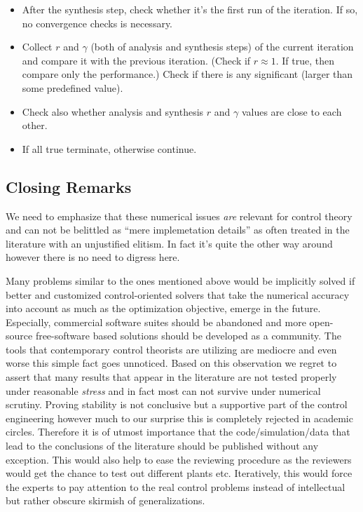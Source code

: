 \begin{itemize}
	\item After the synthesis step, check whether it's the first run of the iteration. If so, no convergence checks is
	necessary.
	\item Collect $r$ and $\gamma$ (both of analysis and synthesis steps) of the current iteration and compare it with 
	the previous iteration. (Check if $r\approx 1$. If true, then compare only the performance.) Check if there is any 
	significant (larger than some predefined value).
	\item Check also whether analysis and synthesis $r$ and $\gamma$ values are close to each other. 
	\item If all true terminate, otherwise continue. 
\end{itemize}







\subsection{Closing Remarks}
We need to emphasize that these numerical issues \emph{are} relevant for control theory and can not be belittled as 
\enquote{mere implemetation details} as often treated in the 
literature with an unjustified elitism. In fact it's quite the other way around however there is no need to digress 
here. 

Many problems similar to the ones mentioned above would be implicitly solved if better and customized control-oriented 
solvers that take the numerical accuracy into account as much as the optimization objective, emerge in the future. 
Especially, commercial software suites should be abandoned and more open-source free-software based solutions should be 
developed as a community. The tools that contemporary control theorists are utilizing are mediocre and even worse this 
simple fact goes unnoticed. Based on this observation we regret to assert that many results that appear in the literature
are not tested properly under reasonable \emph{stress} and in fact most can not survive under numerical scrutiny. 
Proving stability is not conclusive but a supportive part of the control engineering however much to our surprise 
this is completely rejected in academic circles. 
Therefore it is of utmost importance that the code/simulation/data that lead to the conclusions of the literature
should be published without any exception. This would also help to ease the reviewing procedure as the reviewers would 
get the chance to test out different plants etc. Iteratively, this would force the experts to pay attention to the 
real control problems instead of intellectual but rather obscure skirmish of generalizations.


